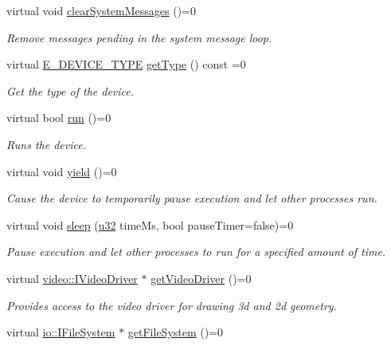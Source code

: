 \begin{DoxyCompactItemize}
virtual void \hyperlink{classirr_1_1IrrlichtDevice_aa10c6151a267d8a1500d5dc7b44425dd}{clear\+System\+Messages} ()=0
\begin{DoxyCompactList}\small\item\em Remove messages pending in the system message loop. \end{DoxyCompactList}\item 
virtual \hyperlink{namespaceirr_ac25d94cf2e1037c7ca18ee79b3bd4505}{E\+\_\+\+D\+E\+V\+I\+C\+E\+\_\+\+T\+Y\+PE} \hyperlink{classirr_1_1IrrlichtDevice_a2a2ec439b1f153169003c4d3e986a7d7}{get\+Type} () const =0
\begin{DoxyCompactList}\small\item\em Get the type of the device. \end{DoxyCompactList}\item 
virtual bool \hyperlink{classirr_1_1IrrlichtDevice_a0489f8151dc43f6f41503ffb5a160b35}{run} ()=0
\begin{DoxyCompactList}\small\item\em Runs the device. \end{DoxyCompactList}\item 
virtual void \hyperlink{classirr_1_1IrrlichtDevice_a731727774fad9fc4c6c1c85277ca36dc}{yield} ()=0
\begin{DoxyCompactList}\small\item\em Cause the device to temporarily pause execution and let other processes run. \end{DoxyCompactList}\item 
virtual void \hyperlink{classirr_1_1IrrlichtDevice_a89a3ecebc0e7c5ae08617b78a6e8a9f7}{sleep} (\hyperlink{namespaceirr_a0416a53257075833e7002efd0a18e804}{u32} time\+Ms, bool pause\+Timer=false)=0
\begin{DoxyCompactList}\small\item\em Pause execution and let other processes to run for a specified amount of time. \end{DoxyCompactList}\item 
virtual \hyperlink{classirr_1_1video_1_1IVideoDriver}{video\+::\+I\+Video\+Driver} $\ast$ \hyperlink{classirr_1_1IrrlichtDevice_ada90707ba5c645d47e000e4e0f87c4c4}{get\+Video\+Driver} ()=0
\begin{DoxyCompactList}\small\item\em Provides access to the video driver for drawing 3d and 2d geometry. \end{DoxyCompactList}\item 
virtual \hyperlink{classirr_1_1io_1_1IFileSystem}{io\+::\+I\+File\+System} $\ast$ \hyperlink{classirr_1_1IrrlichtDevice_a3d8d2dee2f57aa7e6c0d14592de3e6ed}{get\+File\+System} ()=0

\end{DoxyCompactItemize}
